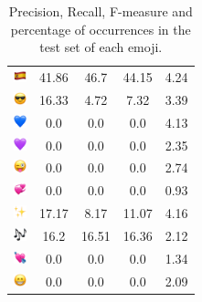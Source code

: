 \documentclass{article}
\begin{document}
\begin{table}
\begin{tabular}{|c|ccc|c|}
\includegraphics[height=0.37cm,width=0.37cm]{img/Spain.png} & 41.86 & 46.7 & 44.15 & 4.24\\ 
\includegraphics[height=0.37cm,width=0.37cm]{img/smiling_face_with_sunglasses.png} & 16.33 & 4.72 & 7.32 & 3.39\\ 
\includegraphics[height=0.37cm,width=0.37cm]{img/blue_heart.png} & 0.0 & 0.0 & 0.0 & 4.13\\ 
\includegraphics[height=0.37cm,width=0.37cm]{img/purple_heart.png} & 0.0 & 0.0 & 0.0 & 2.35\\ 
\includegraphics[height=0.37cm,width=0.37cm]{img/winking_face_with_tongue.png} & 0.0 & 0.0 & 0.0 & 2.74\\ 
\includegraphics[height=0.37cm,width=0.37cm]{img/revolving_hearts.png} & 0.0 & 0.0 & 0.0 & 0.93\\ 
\includegraphics[height=0.37cm,width=0.37cm]{img/sparkles.png} & 17.17 & 8.17 & 11.07 & 4.16\\ 
\includegraphics[height=0.37cm,width=0.37cm]{img/musical_notes.png} & 16.2 & 16.51 & 16.36 & 2.12\\ 
\includegraphics[height=0.37cm,width=0.37cm]{img/heart_with_arrow.png} & 0.0 & 0.0 & 0.0 & 1.34\\ 
\includegraphics[height=0.37cm,width=0.37cm]{img/beaming_face_with_smiling_eyes.png} & 0.0 & 0.0 & 0.0 & 2.09\\ 

\hline
\end{tabular}
\caption{\label{table:emoji_detailed} Precision, Recall, F-measure and percentage of occurrences in the test set of each emoji.}
\end{table}
\end{document}
